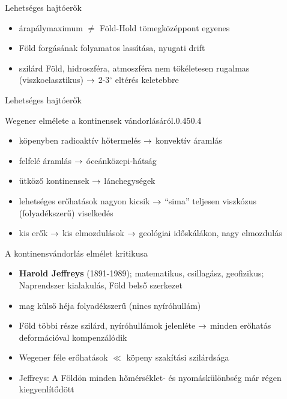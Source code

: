 \begin{frame}{Lehetséges hajtóerők}
    \begin{minipage}[c]{0.575\textwidth}
        \centering
    \end{minipage}
    \begin{minipage}[c]{0.35\textwidth}
        \begin{itemize}
            \item árapálymaximum $\ne$ Föld-Hold tömegközéppont egyenes
            \item Föld forgásának folyamatos lassítása, nyugati drift
            \item szilárd Föld, hidroszféra, atmoszféra nem tökéletesen rugalmas (viszkoelasztikus) $\rightarrow$ 2-3$^\circ$ eltérés keletebbre
        \end{itemize}
    \end{minipage}
\end{frame}


\begin{frame}{Lehetséges hajtóerők}
    \begin{figp}{}{Wegener elmélete a kontinensek vándorlásáról.}{0.45}{0.4}
        \begin{itemize}
            \item köpenyben radioaktív hőtermelés $\rightarrow$ konvektív áramlás
            \item felfelé áramlás $\rightarrow$ óceánközepi-hátság
            \item ütköző kontinensek $\rightarrow$ lánchegységek
            \item lehetséges erőhatások nagyon kicsik $\rightarrow$ ``sima'' teljesen viszkózus (folyadékszerű) viselkedés
            \item kis erők $\rightarrow$ kis elmozdulások $\rightarrow$ geológiai időskálákon, nagy elmozdulás
        \end{itemize}
    \end{figp}
\end{frame}


\begin{frame}{A kontinensvándorlás elmélet kritikusa}
    \begin{itemize}
        \item \textbf{Harold Jeffreys} (1891-1989); matematikus, csillagász, geofizikus; Naprendszer kialakulás, Föld belső szerkezet
        \item mag külső héja folyadékszerű (nincs nyíróhullám)
        \item Föld többi része szilárd, nyíróhullámok jelenléte $\rightarrow$ minden erőhatás deformációval kompenzálódik
        \item Wegener féle erőhatások $\ll$ köpeny szakítási szilárdsága
        \item Jeffreys: A Földön minden hőmérséklet- és nyomáskülönbség már régen kiegyenlítődött
    \end{itemize}
\end{frame}


